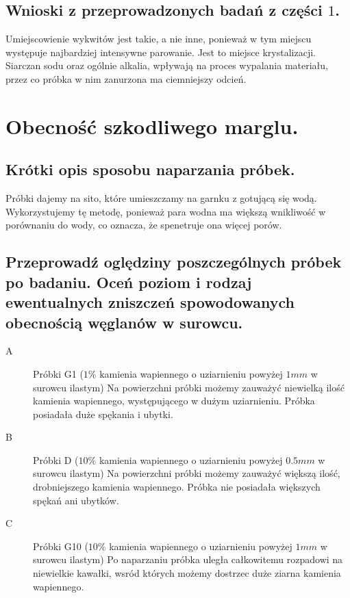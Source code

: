 \subsection{Wnioski z przeprowadzonych badań z części $1$.}

Umiejscowienie wykwitów jest takie, a nie inne, ponieważ w tym miejscu występuje najbardziej intensywne parowanie. Jest to miejsce krystalizacji. Siarczan sodu oraz ogólnie alkalia, wpływają na proces wypalania materiału, przez co próbka w nim zanurzona ma ciemniejszy odcień.

\newpage

\section{Obecność szkodliwego marglu.}



\subsection{Krótki opis sposobu naparzania próbek.}

Próbki dajemy na sito, które umieszczamy na garnku z gotującą się wodą. Wykorzystujemy tę metodę, ponieważ para wodna ma większą wnikliwość w porównaniu do wody, co oznacza, że spenetruje ona więcej porów.

\subsection{Przeprowadź oględziny poszczególnych próbek po badaniu. Oceń poziom i rodzaj ewentualnych zniszczeń spowodowanych obecnością węglanów w surowcu.}

\begin{description}
    \item[A] Próbki G1 ($1\%$ kamienia wapiennego o uziarnieniu powyżej $1mm$ w surowcu ilastym)
    \newline
    \newline
    Na powierzchni próbki możemy zauważyć niewielką ilość kamienia wapiennego, występującego w dużym uziarnieniu. Próbka posiadała duże spękania i ubytki.
    \item[B] Próbki D ($10\%$ kamienia wapiennego o uziarnieniu powyżej $0.5mm$ w surowcu ilastym)
     \newline
     \newline
    Na powierzchni próbki możemy zauważyć większą ilość, drobniejszego kamienia wapiennego. Próbka nie posiadała większych spękań ani ubytków.
    \item[C] Próbki G10 ($10\%$ kamienia wapiennego o uziarnieniu powyżej $1mm$ w surowcu ilastym)  
    \newline
    \newline
    Po naparzaniu próbka uległa całkowitemu rozpadowi na niewielkie 
    \newline
    kawałki, wsród których możemy dostrzec duże ziarna kamienia wapiennego. 
\end{description}

